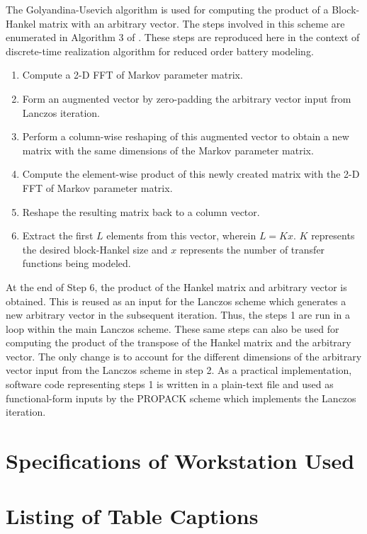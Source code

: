 The Golyandina-Usevich algorithm is used for computing the product
of a Block-Hankel matrix with an arbitrary vector. The steps involved
in this scheme are enumerated in Algorithm 3 of \citep{GolyandinaKorobeynikovShlemovEtAl2015}.
These steps are reproduced here in the context of discrete-time realization
algorithm for reduced order battery modeling.
\begin{enumerate}
	\item Compute a 2-D FFT of Markov parameter matrix.
	\item Form an augmented vector by zero-padding the arbitrary vector input
	from Lanczos iteration.
	\item Perform a column-wise reshaping of this augmented vector to obtain
	a new matrix with the same dimensions of the Markov parameter matrix.
	\item Compute the element-wise product of this newly created matrix with
	the 2-D FFT of Markov parameter matrix.
	\item Reshape the resulting matrix back to a column vector.
	\item Extract the first $L$ elements from this vector, wherein $L=Kx$.
	$K$ represents the desired block-Hankel size and $x$ represents
	the number of transfer functions being modeled.
\end{enumerate}
At the end of Step 6, the product of the Hankel matrix and arbitrary
vector is obtained. This is reused as an input for the Lanczos scheme
which generates a new arbitrary vector in the subsequent iteration.
Thus, the steps 1 are run in a loop within the main Lanczos
scheme. These same steps can also be used for computing the product
of the transpose of the Hankel matrix and the arbitrary vector. The
only change is to account for the different dimensions of the arbitrary
vector input from the Lanczos scheme in step 2. As a practical implementation,
software code representing steps 1 is written in a plain-text
file and used as functional-form inputs by the PROPACK scheme which
implements the Lanczos iteration.

\singlespacing
\section{Specifications of Workstation Used\label{sec:Specifications-of-Workstation}}

\newpage
\section*{Listing of Table Captions}


